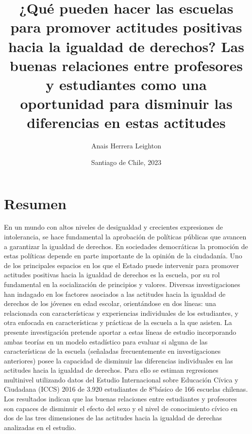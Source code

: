 \documentclass[12pt,twoside]{templates/facsothesis}
\title{ ¿Qué pueden hacer las escuelas para promover actitudes positivas hacia la igualdad de derechos? Las buenas relaciones entre profesores y estudiantes como una oportunidad para disminuir las diferencias en estas actitudes}
\author{Anais Herrera Leighton}
\date{Santiago de Chile, 2023}
\begin{document}

  \maketitle

\frontmatter %
\pagestyle{empty} %



  \setcounter{tocdepth}{1}
  \setlength{\parskip}{0pt}
  \tableofcontents

\setlength\parskip{1em plus 0.1em minus 0.2em}

  \listoftables

  \listoffigures



\mainmatter %
\pagestyle{fancyplain} %

\hypertarget{resumen}{%
\chapter*{Resumen}\label{resumen}}

En un mundo con altos niveles de desigualdad y crecientes expresiones de intolerancia, se hace fundamental la aprobación de políticas públicas que avancen a garantizar la igualdad de derechos. En sociedades democráticas la promoción de estas políticas depende en parte importante de la opinión de la ciudadanía. Uno de los principales espacios en los que el Estado puede intervenir para promover actitudes positivas hacia la igualdad de derechos es la escuela, por su rol fundamental en la socialización de principios y valores. Diversas investigaciones han indagado en los factores asociados a las actitudes hacia la igualdad de derechos de los jóvenes en edad escolar, orientándose en dos líneas: una relacionada con características y experiencias individuales de los estudiantes, y otra enfocada en características y prácticas de la escuela a la que asisten. La presente investigación pretende aportar a estas líneas de estudio incorporando ambas teorías en un modelo estadístico para evaluar si alguna de las características de la escuela (señaladas frecuentemente en investigaciones anteriores) posee la capacidad de disminuir las diferencias individuales en las actitudes hacia la igualdad de derechos. Para ello se estiman regresiones multinivel utilizando datos del Estudio Internacional sobre Educación Cívica y Ciudadana (ICCS) 2016 de 3.920 estudiantes de 8°básico de 166 escuelas chilenas. Los resultados indican que las buenas relaciones entre estudiantes y profesores son capaces de disminuir el efecto del sexo y el nivel de conocimiento cívico en dos de las tres dimensiones de las actitudes hacia la igualdad de derechas analizadas en el estudio.
\end{document}
